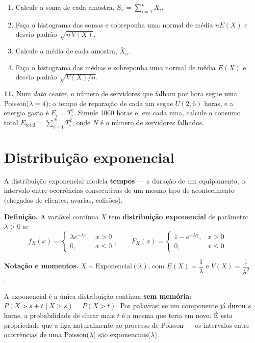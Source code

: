 \documentclass[
  portuguese,
  11pt,
  openany]{book}
\providecommand{\tightlist}{%
  \setlength{\itemsep}{0pt}\setlength{\parskip}{0pt}}
\begin{document}
\begin{enumerate}
\def\labelenumi{(\alph{enumi})}
\tightlist
\item
  Calcule a soma de cada amostra, \(S_n = \sum_{i=1}^n X_i\).
\item
  Faça o histograma das somas e sobreponha uma normal de média \(nE(X)\) e desvio padrão
  \(\sqrt{n\,V(X)}\).
\item
  Calcule a média de cada amostra, \(\bar{X}_n\).
\item
  Faça o histograma das médias e sobreponha uma normal de média \(E(X)\) e desvio padrão
  \(\sqrt{V(X)/n}\).
\end{enumerate}

\textbf{11.} Num \emph{data center}, o número de servidores que falham por hora segue uma
Poisson(\(\lambda = 4\)); o tempo de reparação de cada um segue \(U(2, 6)\) horas, e a
energia gasta é \(E_i = T_i^2\). Simule 1000 horas e, em cada uma, calcule o consumo total
\(E_{\text{total}} = \sum_{i=1}^N T_i^2\), onde \(N\) é o número de servidores falhados.

\section{Distribuição exponencial}\label{distribuiuxe7uxe3o-exponencial}

A distribuição exponencial modela \textbf{tempos} --- a duração de um equipamento, o intervalo
entre ocorrências consecutivas de um mesmo tipo de acontecimento (chegadas de clientes,
avarias, colisões).

\textbf{Definição.} A variável contínua \(X\) tem \textbf{distribuição exponencial} de parâmetro
\(\lambda > 0\) se
\[f_X(x) = \begin{cases} \lambda e^{-\lambda x}, & x > 0 \\ 0, & x \leq 0 \end{cases}, \qquad
F_X(x) = \begin{cases} 1 - e^{-\lambda x}, & x > 0 \\ 0, & x \leq 0 \end{cases}\]

\textbf{Notação e momentos.} \(X \sim \text{Exponencial}(\lambda)\), com \(E(X) = \dfrac{1}{\lambda}\)
e \(V(X) = \dfrac{1}{\lambda^2}\).

A exponencial é a única distribuição contínua \textbf{sem memória}: \(P(X > s + t \mid X > s) = P(X > t)\).
Por palavras: se um componente já durou \(s\) horas, a probabilidade de durar mais \(t\) é a
mesma que teria em novo. É esta propriedade que a liga naturalmente ao processo de
Poisson --- os intervalos entre ocorrências de uma Poisson(\(\lambda\)) são
exponenciais(\(\lambda\)).
\end{document}
